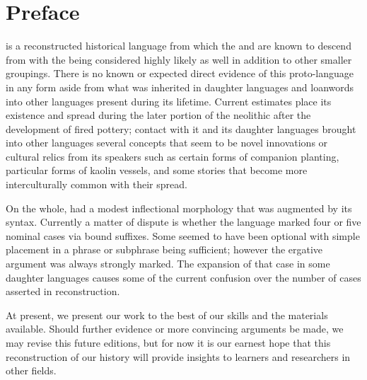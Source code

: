 \section{Preface}
\langname is a reconstructed historical language from which the \branchnorth\comma \branchhigh\comma and \branchlow\space are known to descend from with the \branchremote\space being considered highly likely as well in addition to other smaller groupings. There is no known or expected direct evidence of this proto-language in any form aside from what was inherited in daughter languages and loanwords into other languages present during its lifetime. Current estimates place its existence and spread during the later portion of the neolithic after the development of fired pottery; contact with it and its daughter languages brought into other languages several concepts that seem to be novel innovations or cultural relics from its speakers such as certain forms of companion planting, particular forms of kaolin vessels, and some stories that become more interculturally common with their spread.\par
On the whole, \langname had a modest inflectional morphology that was augmented by its syntax. Currently a matter of dispute is whether the language marked four or five nominal cases via bound suffixes. Some seemed to have been optional with simple placement in a phrase or subphrase being sufficient; however the ergative argument was always strongly marked. The expansion of that case in some daughter languages causes some of the current confusion over the number of cases asserted in reconstruction.\par
At present, we present our work to the best of our skills and the materials available. Should further evidence or more convincing arguments be made, we may revise this future editions, but for now it is our earnest hope that this reconstruction of our history will provide insights to learners and researchers in other fields.
